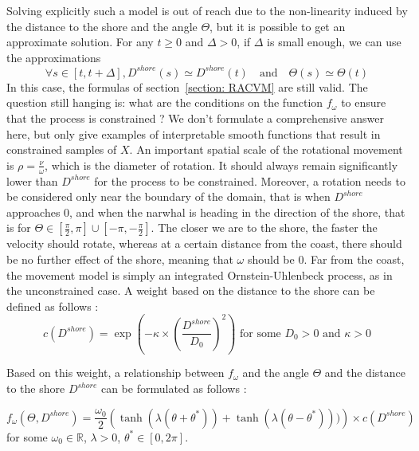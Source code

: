 \documentclass[11pt]{article}
\newcommand {\R}{\mathbb{R}}
\newcommand {\1}{\mathbb{1}}
\begin{document}
Solving explicitly such a model is out of reach due to the non-linearity induced by the distance to the shore and the angle $\Theta$, but it is possible to get an approximate solution.
For any $t \geq 0$ and $\Delta>0$, if $\Delta$ is small enough, we can use the approximations
\[\forall s \in [t,t+\Delta], D^{shore}(s) \simeq D^{shore}(t) \quad \mbox{and} \quad  \Theta(s)\simeq \Theta(t)\]
In this case, the formulas of section~\ref{section: RACVM} are still valid.
The question still hanging is: what are the conditions on the function $f_{\omega}$ to ensure that the process is constrained ?
We don't formulate a comprehensive answer here, but only give examples of interpretable smooth functions that result in constrained samples of $X$.
An important spatial scale of the rotational movement is $\rho=\frac{\nu}{\omega}$, which is the diameter of rotation. It should always remain significantly lower than $D^{shore}$ for the process to be constrained. Moreover, a rotation needs to be considered only near the boundary of the domain, that is when $D^{shore}$ approaches $0$, and when the narwhal is heading in the direction of the shore, that is for $\Theta \in \left[\frac{\pi}{2},\pi\right] \cup \left[-\pi,-\frac{\pi}{2}\right]$.
The closer we are to the shore, the faster the velocity should rotate,
whereas at a certain distance from the coast, there should be no further effect of the shore, meaning that $\omega$ should be $0$. Far from the coast, the movement model is simply an integrated Ornstein-Uhlenbeck process, as in the unconstrained case.
A weight based on the distance to the shore can be defined as follows :
\[c(D^{shore})=\exp\left(-\kappa \times \left(\frac{D^{shore}}{D_0}\right)^2\right)\mbox{ for some } D_0>0 \mbox{ and } \kappa>0\]

Based on this weight, a relationship between $f_{\omega}$ and the angle $\Theta$ and the distance to the shore $D^{shore}$ can be formulated as follows :

\begin{equation}
f_{\omega}(\Theta,D^{shore})=\frac{\omega_0}{2}\left(\tanh(\lambda(\theta+\theta^{*}))+\tanh(\lambda(\theta-\theta^{*})))\right)\times c(D^{shore})
\label{eq: smooth omega}
\end{equation}
for some $\omega_0 \in \R$, $\lambda>0$, $\theta^* \in [0,2\pi]$.
\end{document}
